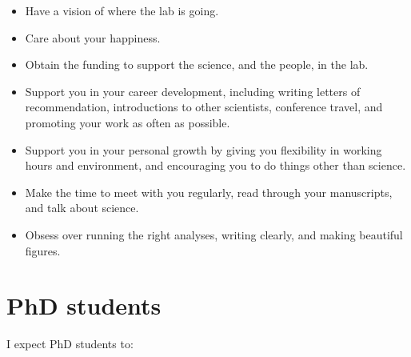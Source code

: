 \documentclass[letterpaper,12pt,oneside]{memoir}
\begin{document}
\begin{itemize}
\item Have a vision of where the lab is going.
\item Care about your happiness.
\item Obtain the funding to support the science, and the people, in the lab.
\item Support you in your career development, including writing letters of recommendation, introductions to other scientists, conference travel, and promoting your work as often as possible.
\item Support you in your personal growth by giving you flexibility in working hours and environment, and encouraging you to do things other than science.
\item Make the time to meet with you regularly, read through your manuscripts, and talk about science.
\item Obsess over running the right analyses, writing clearly, and making beautiful figures.
\end{itemize}






\section{PhD students}

I expect PhD students to:
\end{document}
